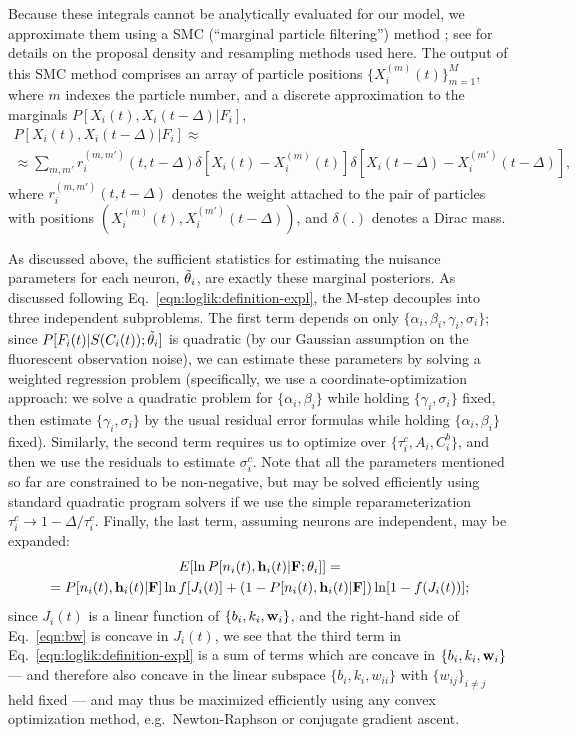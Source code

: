 Because these integrals cannot be analytically evaluated for our model, we approximate them using a SMC (``marginal particle filtering'') method \cite{DGA00,DFG01,GDW04}; see \cite{Vogelstein2009} for details on the proposal density and resampling methods used here. The output of this SMC method comprises an array of particle positions $\{X_i^{(m)}(t)\}_{m=1}^{M}$, where $m$ indexes the particle number, and a discrete approximation to the marginals $P[X_i(t), X_i(t-\Delta) | F_i]$,
\begin{multline}
P[X_i(t), X_i(t-\Delta) | F_i] \approx \\
\approx \sum_{m,m'}
r_i^{(m,m')}(t,t-\Delta) \delta \left[ X_i(t) - X_i^{(m)}(t) \right]
\delta \left[ X_i(t-\Delta) - X_i^{(m')}(t-\Delta) \right],
\label{eqn:particle-fb}
\end{multline}
where $r_i^{(m,m')}(t,t-\Delta)$ denotes the weight attached to the
pair of particles with positions $\left( X_i^{(m)}(t),
X_i^{(m')}(t-\Delta) \right)$, and $\delta(.)$ denotes a Dirac mass.

As discussed above, the sufficient statistics for estimating the nuisance parameters for each neuron, $\tilde{\mathbf{\theta}}_i$, are exactly these marginal posteriors. As discussed following Eq.~\eqref{eqn:loglik:definition-expl}, the M-step decouples into three independent subproblems. The first term depends on only $\{\alpha_i, \beta_i, \gamma_i, \sigma_i\}$; since $P[F_i(t)|S(C_i(t)); \tilde{\mathbf{\theta}}_i]$ is quadratic (by our Gaussian assumption on the fluorescent observation noise), we can estimate these parameters by solving a weighted regression problem (specifically, we use a coordinate-optimization approach: we solve a quadratic problem for $\{\alpha_i, \beta_i\}$ while holding $\{\gamma_i, \sigma_i\}$ fixed, then estimate $\{\gamma_i,\sigma_i\}$ by the usual residual error formulas while holding $\{\alpha_i, \beta_i\}$ fixed). Similarly, the second term requires us to optimize over $\{\tau_i^c, A_i, C_i^b\}$, and then we use the residuals to estimate $\sigma_i^c$. Note that all the parameters mentioned so far are constrained to be non-negative, but may be solved efficiently using standard quadratic program solvers if we use the simple reparameterization $\tau_i^c \to 1- \Delta / \tau_i^c$. Finally, the last term, assuming neurons are independent, may be expanded:
\begin{multline}
E [\ln P[n_i(t), \mathbf{h}_i(t) | {\bf F}; \mathbf{\theta}_i]] =  \\ = P[n_i(t), \mathbf{h}_i(t) |
{\bf F}] \ln f [J_i(t)] + (1-P[n_i(t), \mathbf{h}_i(t) | {\bf F}]) \ln [1-
f(J_i(t))];
\label{eqn:bw}
\end{multline}
since $J_i(t)$ is a linear function of $\{b_i,k_i,\mathbf{w}_i\}$, and the right-hand side of Eq.~\eqref{eqn:bw} is concave in $J_i(t)$, we see that the third term in Eq.~\eqref{eqn:loglik:definition-expl} is a sum of terms which are concave in $\{b_i,k_i,\mathbf{w}_i\}$ --- and therefore also concave in the linear subspace $\{b_i,k_i, w_{ii}\}$ with $\{w_{ij}\}_{i \neq j}$ held fixed --- and may thus be maximized efficiently using any convex optimization method, e.g.\ Newton-Raphson or conjugate gradient ascent.

